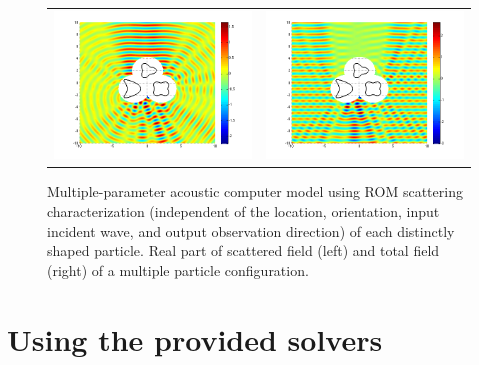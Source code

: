 \documentclass[12pt,letterpaper,final]{article}
\begin{document}
\begin{figure}[ht!]
\centering
\begin{tabular}{ll}
\hspace{-0.5in}
\includegraphics[width=10cm]{multiple_kpt_realscat_field} & \hspace{-1.0in} \includegraphics[width=10cm]{multiple_kpt_total_field} \\
\end{tabular}
\caption{\label{fig:multiple_ex_sim}
Multiple-parameter acoustic computer model  using ROM scattering characterization (independent of the location, orientation, input incident wave, and output observation direction) of  each distinctly shaped particle.   
Real part of scattered field (left) and  total field (right) of  a multiple particle configuration.}
\end{figure}


\part{Using the provided solvers}
\label{part:provided-solvers}
\end{document}
